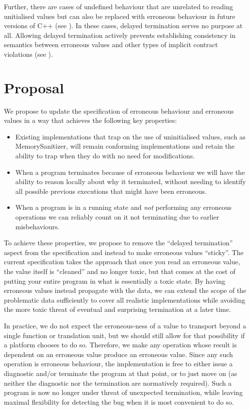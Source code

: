 Further, there are cases of undefined behaviour that are unrelated to reading unitialised values but can also be replaced with erroneous behaviour in future versions of C++ (see \cite{P3100R4}). In these cases, delayed termination serves no purpose at all. Allowing delayed termination actively prevents establishing consistency in semantics between erroneous values and other types of implicit contract violations (see \cite{P3229R0}).

\section{Proposal}

We propose to update the specification of erroneous behaviour and erroneous values in a way that achieves the following key properties:
\begin{itemize}
\item Existing implementations that trap on the use of uninitialised values, such as MemorySanitizer, will remain conforming implementations and retain the ability to trap when they do with no need for modifications.
\item When a program terminates because of erroneous behaviour we will have the ability to reason locally about why it terminated, without needing to identify all possible previous executions that might have been erroneous.
\item When a program is in a running state and \emph{not} performing any erroneous operations we can reliably count on it not terminating due to earlier misbehaviours.
\end{itemize}

To achieve these properties, we propose to remove the ``delayed termination'' aspect from the specification and instead to make erroneous values ``sticky''.  The current specification takes the approach that once you read an erroneous value, the value itself is ``cleaned'' and no longer toxic, but that comes at the cost of putting your entire program in what is essentially a toxic state. By having erroneous values instead propagate with the data, we can extend the scope of the problematic data sufficiently to cover all realistic implementations while avoiding the more toxic threat of eventual and surprising termination at a later time.

In practice, we do not expect the erroneous-ness of a value to transport beyond a single function or translation unit, but we should still allow for that possibility if a platform chooses to do so.   Therefore, we make any operation whose result is dependent on an erroneous value produce an erroneous value. Since any such operation is erroneous behaviour, the implementation is free to either issue a diagnostic and/or terminate the program at that point, or to just move on (as neither the diagnostic nor the termination are normatively required). Such a program is now no longer under threat of unexpected termination, while leaving maximal flexibility for detecting the bug when it is most convenient to do so.

